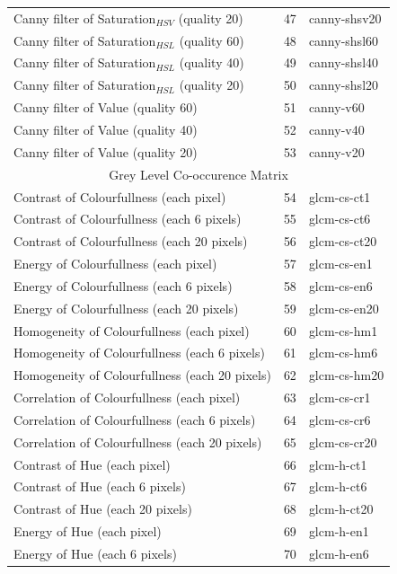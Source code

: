 \documentclass[11pt,a4paper,draft]{report}
\begin{document}
\begin{center}
\begin{longtable}{|l|c|l|}
Canny filter of Saturation$_{HSV}$ (quality 20) & 47 & canny-shsv20 \\
Canny filter of Saturation$_{HSL}$ (quality 60) & 48 & canny-shsl60 \\
Canny filter of Saturation$_{HSL}$ (quality 40) & 49 & canny-shsl40 \\
Canny filter of Saturation$_{HSL}$ (quality 20) & 50 & canny-shsl20 \\
Canny filter of Value (quality 60) & 51 & canny-v60 \\
Canny filter of Value (quality 40) & 52 & canny-v40 \\
Canny filter of Value (quality 20) & 53 & canny-v20 \\

\midrule
\multicolumn{3}{c}{Grey Level Co-occurence Matrix} \\
\midrule
Contrast of Colourfullness (each pixel) & 54 & glcm-cs-ct1 \\
Contrast of Colourfullness (each 6 pixels) & 55 & glcm-cs-ct6 \\
Contrast of Colourfullness (each 20 pixels) & 56 & glcm-cs-ct20 \\
Energy of Colourfullness (each pixel) & 57 & glcm-cs-en1 \\
Energy of Colourfullness (each 6 pixels) & 58 & glcm-cs-en6 \\
Energy of Colourfullness (each 20 pixels) & 59 & glcm-cs-en20 \\
Homogeneity of Colourfullness (each pixel) & 60 & glcm-cs-hm1 \\
Homogeneity of Colourfullness (each 6 pixels) & 61 & glcm-cs-hm6 \\
Homogeneity of Colourfullness (each 20 pixels) & 62 & glcm-cs-hm20 \\
Correlation of Colourfullness (each pixel) & 63 & glcm-cs-cr1 \\
Correlation of Colourfullness (each 6 pixels) & 64 & glcm-cs-cr6 \\
Correlation of Colourfullness (each 20 pixels) & 65 & glcm-cs-cr20 \\
Contrast of Hue (each pixel) & 66 & glcm-h-ct1 \\
Contrast of Hue (each 6 pixels) & 67 & glcm-h-ct6 \\
Contrast of Hue (each 20 pixels) & 68 & glcm-h-ct20 \\
Energy of Hue (each pixel) & 69 & glcm-h-en1 \\
Energy of Hue (each 6 pixels) & 70 & glcm-h-en6 \\

\end{longtable}
\end{center}
\end{document}
